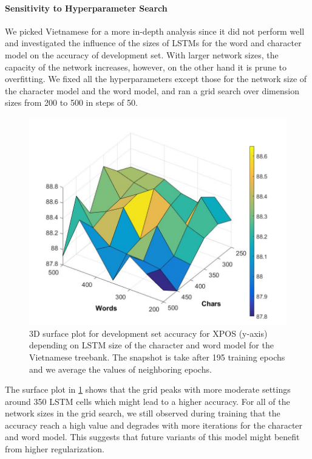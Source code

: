 \documentclass[11pt,a4paper]{article}
\begin{document}
\paragraph{Sensitivity to Hyperparameter Search}

We picked Vietnamese for a more in-depth analysis since it did not perform well and investigated the influence of the sizes of LSTMs for the word and character model on the accuracy of development set. With larger network sizes, the capacity of the network increases, however, on the other hand it is prune to overfitting. We fixed all the hyperparameters except those for the network size of the character model and the word model, and ran a grid search over dimension sizes from 200 to 500 in steps of 50. 
\begin{figure}[t!]
\vspace{-0.7cm}
\includegraphics[scale=0.27]{bernd.jpg}
\caption{3D surface plot for development set accuracy for XPOS (y-axis) depending on LSTM size of the character and word model for the Vietnamese treebank. The snapshot is take after 195 training epochs and we average the values of neighboring epochs.
}
\label{figure:3d-vietnamese}
\vspace{-0.3cm}
\end{figure}
The surface plot in \ref{figure:3d-vietnamese} shows that the grid peaks with more moderate settings around 350 LSTM cells which might lead to a higher accuracy. For all of the network sizes in the grid search, we still observed during training that the accuracy reach a high value and degrades with more iterations for the character and word model. This suggests that future variants of this model might benefit from higher regularization.
\end{document}
